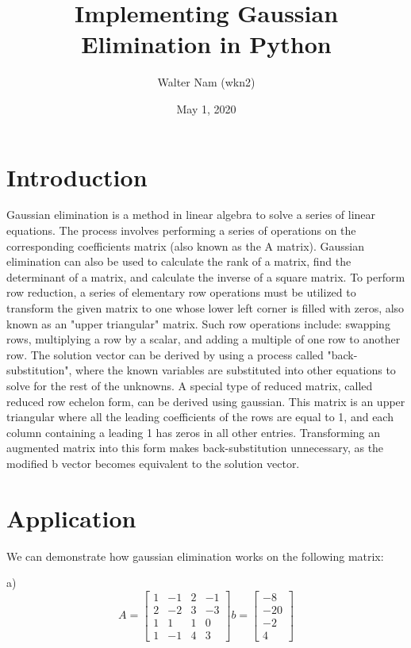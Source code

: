 \documentclass{article}
\begin{document}
           

    \title{Implementing Gaussian Elimination in Python}          
    \author{Walter Nam  (wkn2)}        
    \date{May 1, 2020}      

    \maketitle             

    \section{Introduction} 
    Gaussian elimination is a method in linear algebra to solve a series of linear equations. The process involves performing a series of operations on the corresponding coefficients matrix (also known as the A matrix). Gaussian elimination can also be used to calculate the rank of a matrix, find the determinant of a matrix, and calculate the inverse of a square matrix. To perform row reduction, a series of elementary row operations must be utilized to transform the given matrix to one whose lower left corner is filled with zeros, also known as an "upper triangular" matrix. Such row operations include: swapping rows, multiplying a row by a scalar, and adding a multiple of one row to another row. The solution vector can be derived by using a process called "back-substitution", where the known variables are substituted into other equations to solve for the rest of the unknowns. A special type of reduced matrix, called reduced row echelon form, can be derived using gaussian. This matrix is an upper triangular where all the leading coefficients of the rows are equal to 1, and each column containing a leading 1 has zeros in all other entries. Transforming an augmented matrix into this form makes back-substitution unnecessary, as the modified b vector becomes equivalent to the solution vector.  

    \section{Application}  
    We can demonstrate how gaussian elimination works on the following matrix: 
      
    a)
        $$
        A =  \begin{bmatrix}1&-1&2&-1\\2&-2&3&-3\\1&1&1&0\\1&-1&4&3\end{bmatrix} 
b =   \begin{bmatrix}-8\\-20\\-2\\4\end{bmatrix} 
        $$
        
\end{document}
